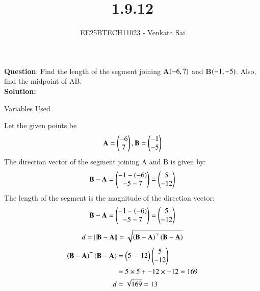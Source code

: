 \documentclass[journal]{IEEEtran}
\begin{document}


\title{1.9.12}
\author{EE25BTECH11023 - Venkata Sai}
{\let\newpage\relax\maketitle}

\renewcommand{\thefigure}{\theenumi}
\renewcommand{\thetable}{\theenumi}

\renewcommand{\thetable}{\theenumi}

\textbf{Question}:\newline
Find the length of the segment joining \textbf{A}$\left(-6,7\right)$ and \textbf{B}$\left(-1,-5\right)$. Also, find the
midpoint of AB. 
\\
\textbf{Solution: }
\begin{table}[H]    
  \centering
  
  \caption{Variables Used}
\end{table}
Let the given points be
 \begin{align}
 \mathbf{A} = \begin{pmatrix}-6 \\ 7\end{pmatrix}, \mathbf{B} = \begin{pmatrix}-1 \\ -5\end{pmatrix} 
 \end{align}
The direction vector of the segment joining A and B is given by:
\begin{align}
\mathbf{B} - \mathbf{A} = \begin{pmatrix}-1 - (-6) \\ -5 - 7\end{pmatrix} = \begin{pmatrix}5 \\ -12\end{pmatrix} 
\end{align}
The length of the segment is the magnitude of the direction vector:
 \begin{align}
\mathbf{B} - \mathbf{A} = \begin{pmatrix}-1 - (-6) \\ -5 - 7\end{pmatrix} = \begin{pmatrix}5 \\ -12\end{pmatrix}  
\end{align}
\begin{align}
d = \|\mathbf{B-A}\| = \sqrt{\left(\mathbf{B}-\mathbf{A}\right)^\top \left(\mathbf{B}-\mathbf{A}\right)} 
\end{align}
\begin{align}
\brak{\vec{B}-\vec{A}}^\top \brak{\vec{B}-\vec{A}}&=\myvec{5  \ -12}\myvec{5 \\ -12}\\
&=5\times5+-12\times-12 = 169\\
d &=\sqrt{169}=13
\end{align}
\end{document}
